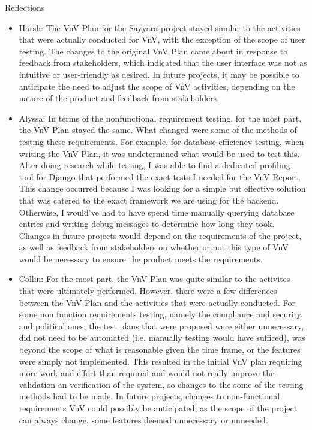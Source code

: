 \documentclass[12pt, titlepage]{article}
\begin{document}
Reflections

\begin{itemize}
    \item Harsh: The VnV Plan for the Sayyara project stayed similar to the activities that were actually conducted for VnV, with the exception of the scope of user testing. The changes to the original VnV Plan came about in response to feedback from stakeholders, which indicated that the user interface was not as intuitive or user-friendly as desired. In future projects, it may be possible to anticipate the need to adjust the scope of VnV activities, depending on the nature of the product and feedback from stakeholders.

    \item Alyssa: In terms of the nonfunctional requirement testing, for the most part, the VnV Plan stayed the same. What changed were some of the methods of testing these requirements. For example, for database efficiency testing, when writing the VnV Plan, it was undetermined what would be used to test this. After doing research while testing, I was able to find a dedicated profiling tool for Django that performed the exact tests I needed for the VnV Report. This change occurred because I was looking for a simple but effective solution that was catered to the exact framework we are using for the backend. Otherwise, I would've had to have spend time manually querying database entries and writing debug messages to determine how long they took. Changes in future projects would depend on the requirements of the project, as well as feedback from stakeholders on whether or not this type of VnV would be necessary to ensure the product meets the requirements.

    \item Collin: For the most part, the VnV Plan was quite similar to the activites that were ultimately performed. However, there were a few differences between the VnV Plan and the activities that were actually conducted. For some non function requirements testing, namely the compliance and security, and political ones, the test plans that were proposed were either unnecessary, did not need to be automated (i.e. manually testing would have sufficed), was beyond the scope of what is reasonable given the time frame, or the features were simply not implemented. This resulted in the initial VnV plan requiring more work and effort than required and would not really improve the validation an verification of the system, so changes to the some of the testing methods had to be made. In future projects, changes to non-functional requirements VnV could possibly be anticipated, as the scope of the project can always change, some features deemed unnecessary or unneeded.


\end{itemize}
\end{document}
